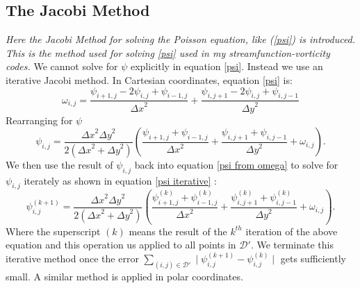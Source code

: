 \documentclass{article}
\begin{document}
	\subsection*{The Jacobi Method}
	{\it{Here the Jacobi Method for solving the Poisson equation, like (\ref{psi}) is introduced. This is the method used for solving \ref{psi} used in my streamfunction-vorticity codes.}}
	\vspace{0.3cm}
	\newline
	We cannot solve for $\psi$ explicitly in equation \ref{psi}. Instead we use an iterative Jacobi method. In Cartesian coordinates, equation \ref{psi} is:
	\begin{equation}
		\omega_{i,j} = \frac{\psi_{i+1,j} - 2 \psi_{i,j} + \psi_{i-1,j}  }{{\Delta x}^2} + \frac{\psi_{i,j+1} - 2 \psi_{i,j} + \psi_{i,j-1}  }{{\Delta y}^2}
		\label{psi disc}
	\end{equation}
	Rearranging for $\psi$
	\begin{equation}
		\psi_{i,j} = \frac{{\Delta x}^2 {\Delta y}^2  }{2({\Delta x}^2  + {\Delta y}^2)} (\frac{\psi_{i+1,j} +\psi_{i-1,j} }{{\Delta x}^2} + \frac{\psi_{i,j+1} +\psi_{i,j-1}  }{{\Delta y}^2 }  + \omega_{i,j}).
		\label{psi from omega}
	\end{equation}
	We then use the result of $\psi_{i,j}$ back into equation \ref{psi from omega} to solve for $\psi_{i,j}$ iterately as shown in equation \ref{psi iterative} \cite{burkardt2011jacobi, adair2015developing}:
	\begin{equation}
		\psi_{i,j}^{(k+1)} = \frac{{\Delta x}^2 {\Delta y}^2  }{2({\Delta x}^2  + {\Delta y}^2)} (\frac{\psi_{i+1,j}^{(k)} +\psi_{i-1,j}^{(k)}  }{{\Delta x}^2} + \frac{\psi_{i,j+1}^{(k)} +\psi_{i,j-1}^{(k)}  }{{\Delta y}^2 } + \omega_{i,j}).
		\label{psi iterative}
	\end{equation}
	Where the superscript $(k)$ means the result of the $k^{th}$ iteration of the above equation and this operation us applied to all points in $\mathcal{D}'$.
	 We terminate this iterative method once the error $\sum_{(i,j) \in \mathcal{D'}} \mid \psi_{i,j}^{(k+1)} - \psi_{i,j}^{(k)} \mid$ gets sufficiently small. A similar method is applied in polar coordinates. 



\end{document}
